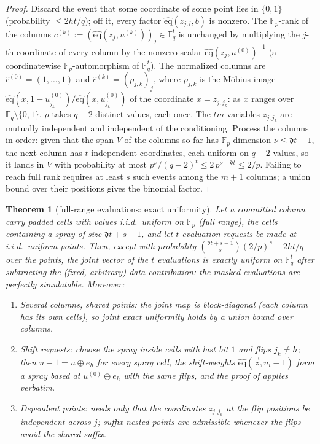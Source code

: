 \documentclass{article}
\newcommand{\Fp}{\mathbb{F}_p}
\newcommand{\Fq}{\mathbb{F}_q}
\newcommand{\extdeg}{\mathfrak{d}}
\newcommand{\eqf}{\widehat{\mathrm{eq}}}
\newtheorem{theorem}{Theorem}[section]
\theoremstyle{definition}
\begin{document}
\begin{proof}
Discard the event that some coordinate of some point lies in $\{0,1\}$ (probability $\leq 2ht/q$); off it, every factor $\eqf(z_{j,l}, b)$ is nonzero. The $\Fp$-rank of the columns $c^{(k)} := (\eqf(z_j, u^{(k)}))_j \in \Fq^t$ is unchanged by multiplying the $j$-th coordinate of every column by the nonzero scalar $\eqf(z_j, u^{(0)})^{-1}$ (a coordinatewise $\Fp$-automorphism of $\Fq^t$). The normalized columns are $\hat c^{(0)} = (1, \dots, 1)$ and $\hat c^{(k)} = (\rho_{j,k})_j$, where $\rho_{j,k}$ is the M\"obius image $\eqf(x, 1 - u^{(0)}_{j_k})/\eqf(x, u^{(0)}_{j_k})$ of the coordinate $x = z_{j, j_k}$: as $x$ ranges over $\Fq \setminus \{0,1\}$, $\rho$ takes $q - 2$ distinct values, each once. The $tm$ variables $z_{j, j_k}$ are mutually independent and independent of the conditioning. Process the columns in order: given that the span $V$ of the columns so far has $\Fp$-dimension $\nu \leq \extdeg t - 1$, the next column has $t$ independent coordinates, each uniform on $q - 2$ values, so it lands in $V$ with probability at most $p^{\nu}/(q-2)^t \leq 2\, p^{\nu - \extdeg t} \leq 2/p$. Failing to reach full rank requires at least $s$ such events among the $m+1$ columns; a union bound over their positions gives the binomial factor.
\end{proof}

\begin{theorem}[full-range evaluations: exact uniformity]\label{thm:fullrange}
Let a committed column carry padded cells with values i.i.d.\ uniform on $\Fp$ (full range), the cells containing a spray of size $\extdeg t + s - 1$, and let $t$ evaluation requests be made at i.i.d.\ uniform points. Then, except with probability $\binom{\extdeg t + s - 1}{s}(2/p)^s + 2ht/q$ over the points, the joint vector of the $t$ evaluations is \emph{exactly} uniform on $\Fq^t$ after subtracting the (fixed, arbitrary) data contribution: the masked evaluations are perfectly simulatable. Moreover:
\begin{enumerate}
    \item \emph{Several columns, shared points:} the joint map is block-diagonal (each column has its own cells), so joint exact uniformity holds by a union bound over columns.
    \item \emph{Shift requests:} choose the spray inside cells with last bit $1$ and flips $j_k \neq h$; then $u - 1 = u \oplus e_h$ for every spray cell, the shift-weights $\eqf(\vec z, u_i - 1)$ form a spray based at $u^{(0)} \oplus e_h$ with the same flips, and the proof of  applies verbatim.
    \item \emph{Dependent points:}  needs only that the coordinates $z_{j, j_k}$ at the flip positions be independent across $j$; suffix-nested points are admissible whenever the flips avoid the shared suffix.
\end{enumerate}
\end{theorem}
\end{document}
